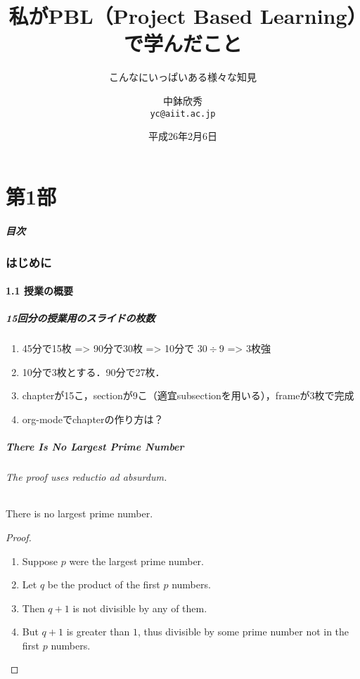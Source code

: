 \documentclass{beamer}
\title[私がPBLで学んだこと]{私がPBL（Project Based Learning）で学んだこと}
\subtitle{こんなにいっぱいある様々な知見}
\author[中鉢欣秀]{中鉢欣秀 \\ \texttt{yc@aiit.ac.jp}}
\institute{産業技術大学院大学}
\date[2014-02-06]{平成26年2月6日}
\begin{document}
\begin{frame}[t]
  \maketitle
\end{frame}

\part{第1部}

\begin{frame}
  \frametitle{目次}
  \tableofcontents
\end{frame}

\section{はじめに}
\subsection{1.1 授業の概要}

\begin{frame}[t]
\frametitle{15回分の授業用のスライドの枚数}
\begin{enumerate}
\item 45分で15枚 => 90分で30枚 => 10分で $30 \div 9$ => 3枚強
\item 10分で3枚とする．90分で27枚．
\item chapterが15こ，sectionが9こ（適宜subsectionを用いる），frameが3枚で完成
\item org-modeでchapterの作り方は？
\end{enumerate}
\end{frame}

\begin{frame}
\frametitle{There Is No Largest Prime Number}
\framesubtitle{The proof uses \textit{reductio ad absurdum}.}
\begin{theorem}
There is no largest prime number.
\end{theorem}
\begin{proof}
\begin{enumerate}
\item<1-> Suppose $p$ were the largest prime number.
\item<2-> Let $q$ be the product of the first $p$ numbers.
\item<3-> Then $q + 1$ is not divisible by any of them.
\item<1-> But $q + 1$ is greater than $1$, thus divisible by some prime
number not in the first $p$ numbers.\qedhere
\end{enumerate}
\end{proof}
\end{frame}
\end{document}
